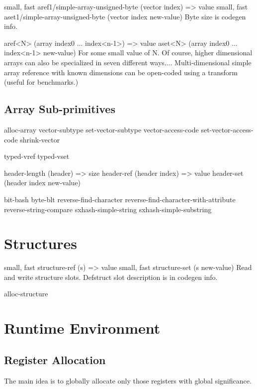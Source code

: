 {\begin{itemize, spread 0, spacing 1}
{small, fast} aref1/simple-array-unsigned-byte (vector index) => value
{small, fast} aset1/simple-array-unsigned-byte (vector index new-value)
    Byte size is codegen info.

aref<N> (array index0 ... index<n-1>) => value
aset<N> (array index0 ... index<n-1> new-value)
    For some small value of N.  Of course, higher dimensional arrays can also
    be specialized in seven different ways....  Multi-dimensional simple array
    reference with known dimensions can be open-coded using a transform (useful
    for benchmarks.)



\section{Array Sub-primitives}

alloc-array
vector-subtype
set-vector-subtype
vector-access-code
set-vector-access-code
shrink-vector

typed-vref
typed-vset

header-length (header) => size
header-ref (header index) => value
header-set (header index new-value)

bit-bash
byte-blt
{reverse-}find-character
{reverse-}find-character-with-attribute
{reverse-}string-compare
sxhash-simple-string
sxhash-simple-substring


\chapter{Structures}

{small, fast} structure-ref (s) => value
{small, fast} structure-set (s new-value)
    Read and write structure slots.  Defstruct slot description is in codegen
    info.

alloc-structure


\chapter{Runtime Environment}
\label{Runtime}


\section{Register Allocation}

The main idea is to globally allocate only those registers with global
significance.


\end{itemize, spread 0, spacing 1}}
